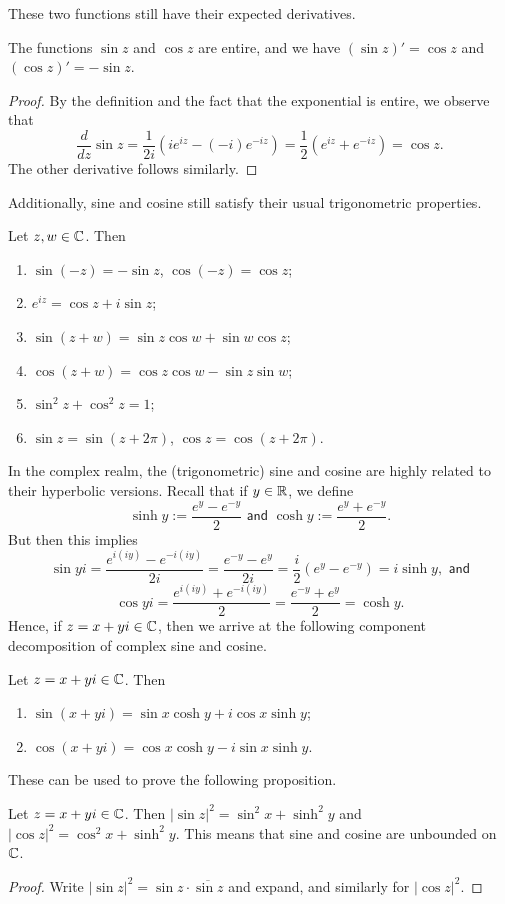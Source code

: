 \documentclass{article}
\begin{document}
These two functions still have their expected derivatives.
\begin{proposition}
The functions $\sin z$ and $\cos z$ are entire, and we have $(\sin z)' = \cos z$ and $(\cos z)' = -\sin z$.
\end{proposition}
\begin{proof}
By the definition and the fact that the exponential is entire, we observe that
$$\frac d{dz}\sin z= \frac 1{2i}(ie^{iz} - (-i)e^{-iz}) = \frac 12(e^{iz}+e^{-iz}) = \cos z.$$
The other derivative follows similarly.
\end{proof}
Additionally, sine and cosine still satisfy their usual trigonometric properties.
\begin{proposition}
Let $z, w\in\mathbb C$. Then
\begin{enumerate}
    \item $\sin(-z) = -\sin z$, $\cos(-z) = \cos z$;
    \item $e^{iz} = \cos z + i\sin z$;
    \item $\sin(z+w) = \sin z\cos w + \sin w \cos z$;
    \item $\cos(z+w) = \cos z\cos w - \sin z \sin w$;
    \item $\sin^2z+\cos^2z=1$;
    \item $\sin z=  \sin(z+2\pi)$, $\cos z = \cos(z + 2\pi)$.
\end{enumerate}
\end{proposition}
In the complex realm, the (trigonometric) sine and cosine are highly related to their hyperbolic versions. Recall that if $y\in \mathbb R$, we define
$$\sinh y := \frac{e^y - e^{-y}}{2} \textsf{ and } \cosh y := \frac{e^y + e^{-y}}2.$$
But then this implies
$$\sin yi = \frac{e^{i(iy)} - e^{-i(iy)}}{2i} = \frac{e^{-y} - e^y}{2i} = \frac i2(e^y - e^{-y}) = i\sinh y, \textsf{ and}$$
$$\cos yi = \frac{e^{i(iy)} + e^{-i(iy)}}{2} = \frac{e^{-y}+e^y}2=\cosh y.$$
Hence, if $z=x+yi\in\mathbb C$, then we arrive at the following component decomposition of complex sine and cosine.
\begin{proposition}
Let $z = x+yi\in \mathbb C$. Then
\begin{enumerate}
    \item $\sin(x+yi) = \sin x \cosh y + i\cos x \sinh y$;
    \item $\cos(x+yi) = \cos x\cosh y - i\sin x \sinh y$.
\end{enumerate}
\end{proposition}
These can be used to prove the following proposition.
\begin{proposition}
Let $z=x+yi\in\mathbb C$. Then $|\sin z|^2 = \sin^2 x + \sinh^2 y$ and $|\cos z|^2 = \cos^2x + \sinh^2 y$. This means that sine and cosine are unbounded on $\mathbb C$.
\end{proposition}
\begin{proof}
Write $|\sin z|^2 = \sin z \cdot \overline{\sin z}$ and expand, and similarly for $|\cos z|^2$.
\end{proof}
\end{document}
